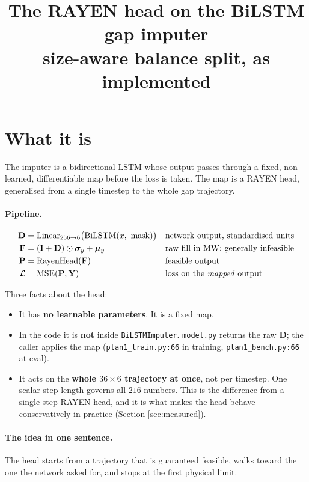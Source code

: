 \documentclass[11pt]{article}
\title{The RAYEN head on the BiLSTM gap imputer\\
\large size-aware balance split, as implemented}
\author{}
\date{}
\begin{document}
\maketitle

\section{What it is}

The imputer is a bidirectional LSTM whose output passes through a fixed,
non-learned, differentiable map before the loss is taken. The map is a RAYEN
head, generalised from a single timestep to the whole gap trajectory.

\paragraph{Pipeline.}
\begin{align*}
\mathbf{D} &= \mathrm{Linear}_{256\to 6}\bigl(\mathrm{BiLSTM}(x,\ \mathrm{mask})\bigr)
 && \text{network output, standardised units}\\
\mathbf{F} &= (\mathbf{I}+\mathbf{D})\odot\bm{\sigma}_y+\bm{\mu}_y
 && \text{raw fill in MW; generally infeasible}\\
\mathbf{P} &= \mathrm{RayenHead}(\mathbf{F})
 && \text{feasible output}\\
\mathcal{L} &= \mathrm{MSE}(\mathbf{P},\mathbf{Y})
 && \text{loss on the \emph{mapped} output}
\end{align*}

Three facts about the head:
\begin{itemize}
\item It has \textbf{no learnable parameters}. It is a fixed map.
\item In the code it is \textbf{not} inside \texttt{BiLSTMImputer}.
      \texttt{model.py} returns the raw $\mathbf{D}$; the caller applies the map
      (\texttt{plan1\_train.py:66} in training, \texttt{plan1\_bench.py:66} at eval).
\item It acts on the \textbf{whole $36\times6$ trajectory at once}, not per
      timestep. One scalar step length governs all $216$ numbers. This is the
      difference from a single-step RAYEN head, and it is what makes the head
      behave conservatively in practice (Section \ref{sec:measured}).
\end{itemize}

\paragraph{The idea in one sentence.}
The head starts from a trajectory that is guaranteed feasible, walks toward the
one the network asked for, and stops at the first physical limit.
\end{document}
